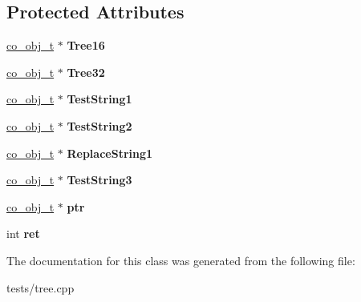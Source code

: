 \subsection*{Protected Attributes}
\begin{DoxyCompactItemize}
\item 
\hypertarget{classTreeTest_a262dbb122877911eb0a8a2c79abc891e}{\hyperlink{structco__obj__t}{co\-\_\-obj\-\_\-t} $\ast$ {\bfseries Tree16}}\label{classTreeTest_a262dbb122877911eb0a8a2c79abc891e}

\item 
\hypertarget{classTreeTest_a03999420e4ce83dd4440f255e592d8c0}{\hyperlink{structco__obj__t}{co\-\_\-obj\-\_\-t} $\ast$ {\bfseries Tree32}}\label{classTreeTest_a03999420e4ce83dd4440f255e592d8c0}

\item 
\hypertarget{classTreeTest_aa65307950ea381fcccf0c89c02d6e5e3}{\hyperlink{structco__obj__t}{co\-\_\-obj\-\_\-t} $\ast$ {\bfseries Test\-String1}}\label{classTreeTest_aa65307950ea381fcccf0c89c02d6e5e3}

\item 
\hypertarget{classTreeTest_a0eb58bddd27d6f74d1ec72bba967e3fc}{\hyperlink{structco__obj__t}{co\-\_\-obj\-\_\-t} $\ast$ {\bfseries Test\-String2}}\label{classTreeTest_a0eb58bddd27d6f74d1ec72bba967e3fc}

\item 
\hypertarget{classTreeTest_a2cadc4638b7aa4bebe3b233b5dad4bfc}{\hyperlink{structco__obj__t}{co\-\_\-obj\-\_\-t} $\ast$ {\bfseries Replace\-String1}}\label{classTreeTest_a2cadc4638b7aa4bebe3b233b5dad4bfc}

\item 
\hypertarget{classTreeTest_a30311c961c18b22dc91ecb9da8939c93}{\hyperlink{structco__obj__t}{co\-\_\-obj\-\_\-t} $\ast$ {\bfseries Test\-String3}}\label{classTreeTest_a30311c961c18b22dc91ecb9da8939c93}

\item 
\hypertarget{classTreeTest_a3ea8dde968a96f26b4d79082498e7812}{\hyperlink{structco__obj__t}{co\-\_\-obj\-\_\-t} $\ast$ {\bfseries ptr}}\label{classTreeTest_a3ea8dde968a96f26b4d79082498e7812}

\item 
\hypertarget{classTreeTest_ae7d983b14a020f8f7a4d661626f67863}{int {\bfseries ret}}\label{classTreeTest_ae7d983b14a020f8f7a4d661626f67863}

\end{DoxyCompactItemize}


The documentation for this class was generated from the following file\-:\begin{DoxyCompactItemize}
\item 
tests/tree.\-cpp\end{DoxyCompactItemize}
